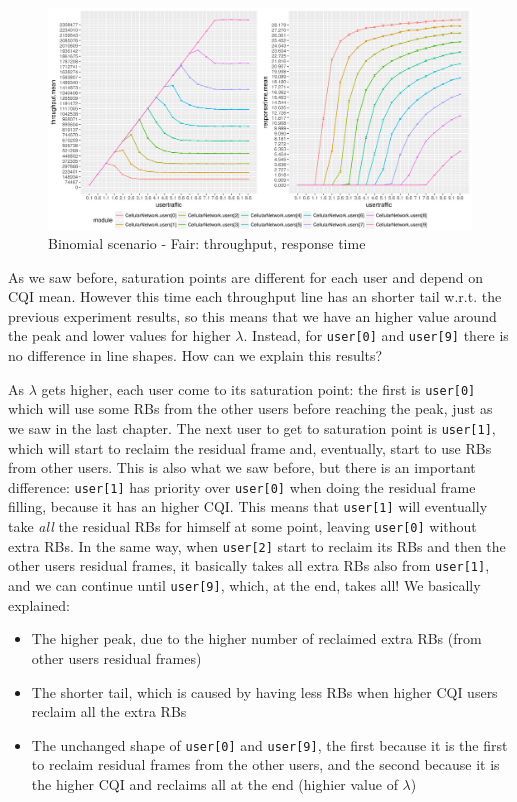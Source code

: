 \begin{figure}[H]
  \includegraphics[width=1\textwidth]{images/all-binombest.png}
  \caption{Binomial scenario - Fair: throughput, response time}
  \label{fig:all-binombest}
\end{figure}
As we saw before, saturation points are different for each user and depend on CQI mean. However this time each throughput line has an shorter tail w.r.t. the previous experiment results, so this means that we have an higher value around the peak and lower values for higher \(\lambda\). Instead, for \texttt{user[0]} and \texttt{user[9]} there is no difference in line shapes. How can we explain this results?

As \(\lambda\) gets higher, each user come to its saturation point: the first is \texttt{user[0]} which will use some RBs from the other users before reaching the peak, just as we saw in the last chapter. The next user to get to saturation point is \texttt{user[1]}, which will start to reclaim the residual frame and, eventually, start to use RBs from other users. This is also what we saw before, but there is an important difference: \texttt{user[1]} has priority over \texttt{user[0]} when doing the residual frame filling, because it has an higher CQI. This means that \texttt{user[1]} will eventually take \textit{all} the residual RBs for himself at some point, leaving \texttt{user[0]} without extra RBs. In the same way, when \texttt{user[2]} start to reclaim its RBs and then the other users residual frames, it basically takes all extra RBs also from \texttt{user[1]}, and we can continue until \texttt{user[9]}, which, at the end, takes all!
We basically explained:
\begin{itemize}
	\item The higher peak, due to the higher number of reclaimed extra RBs (from other users residual frames)
	\item The shorter tail, which is caused by having less RBs when higher CQI users reclaim all the extra RBs
	\item The unchanged shape of \texttt{user[0]} and \texttt{user[9]}, the first because it is the first to reclaim residual frames from the other users, and the second because it is the higher CQI and reclaims all at the end (highier value of \(\lambda\))
\end{itemize}

